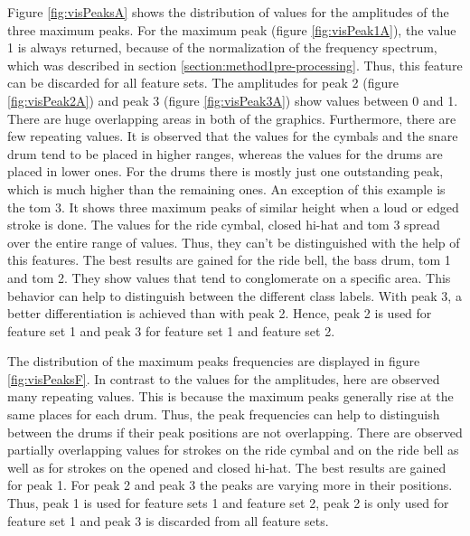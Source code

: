 Figure \ref{fig:visPeaksA} shows the distribution of values for the amplitudes of the three maximum peaks. For the maximum peak (figure \ref{fig:visPeak1A}), the value 1 is always returned, because of the normalization of the frequency spectrum, which was described in section \ref{section:method1pre-processing}. Thus, this feature can be discarded for all feature sets. The amplitudes for peak 2 (figure \ref{fig:visPeak2A}) and peak 3 (figure \ref{fig:visPeak3A}) show values between 0 and 1. There are huge overlapping areas in both of the graphics. Furthermore, there are few repeating values. It is observed that the values for the cymbals and the snare drum tend to be placed in higher ranges, whereas the values for the drums are placed in lower ones. For the drums there is mostly just one outstanding peak, which is much higher than the remaining ones. An exception of this example is the tom 3. It shows three maximum peaks of similar height when a loud or edged stroke is done. The values for the ride cymbal, closed hi-hat and tom 3 spread over the entire range of values. Thus, they can't be distinguished with the help of this features. The best results are gained for the ride bell, the bass drum, tom 1 and tom 2. They show values that tend to conglomerate on a specific area. This behavior can help to distinguish between the different class labels. With peak 3, a better differentiation is achieved than with peak 2. Hence, peak 2 is used for feature set 1 and peak 3 for feature set 1 and feature set 2.

The distribution of the maximum peaks frequencies are displayed in figure \ref{fig:visPeaksF}. In contrast to the values for the amplitudes, here are observed many repeating values. This is because the maximum peaks generally rise at the same places for each drum. Thus, the peak frequencies can help to distinguish between the drums if their peak positions are not overlapping. There are observed partially overlapping values for strokes on the ride cymbal and on the ride bell as well as for strokes on the opened and closed hi-hat. The best results are gained for peak 1. For peak 2 and peak 3 the peaks are varying more in their positions. Thus, peak 1 is used for feature sets 1 and feature set 2, peak 2 is only used for feature set 1 and peak 3 is discarded from all feature sets.

